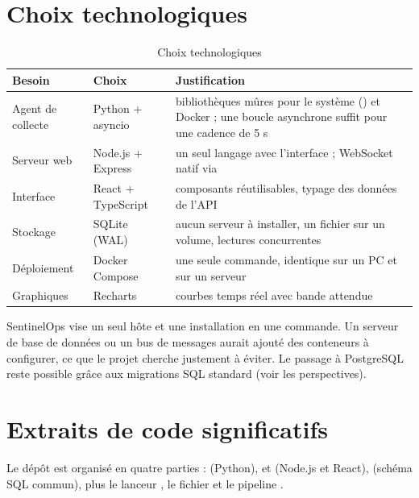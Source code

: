 \section{Choix technologiques}

\begin{table}[htbp]
\centering
\small
\begin{tabularx}{\linewidth}{L{3cm}L{3.4cm}Y}
\toprule
\textbf{Besoin} & \textbf{Choix} & \textbf{Justification} \\
\midrule
Agent de collecte & Python + asyncio & bibliothèques mûres pour le système () et Docker ; une boucle asynchrone suffit pour une cadence de 5 s \\
Serveur web & Node.js + Express & un seul langage avec l'interface ; WebSocket natif via  \\
Interface & React + TypeScript & composants réutilisables, typage des données de l'API \\
Stockage & SQLite (WAL) & aucun serveur à installer, un fichier sur un volume, lectures concurrentes \\
Déploiement & Docker Compose & une seule commande, identique sur un PC et sur un serveur \\
Graphiques & Recharts & courbes temps réel avec bande attendue \\
\bottomrule
\end{tabularx}
\caption{Choix technologiques}
\label{tab:choix}
\end{table}

\begin{aretenir}
SentinelOps vise un seul hôte et une installation en une commande. Un serveur de base de
données ou un bus de messages aurait ajouté des conteneurs à configurer, ce que le projet
cherche justement à éviter. Le passage à PostgreSQL reste possible grâce aux migrations SQL
standard (voir les perspectives).
\end{aretenir}

\section{Extraits de code significatifs}

Le dépôt est organisé en quatre parties :  (Python),  et  (Node.js et React),  (schéma SQL commun), plus le lanceur , le fichier  et le pipeline .

